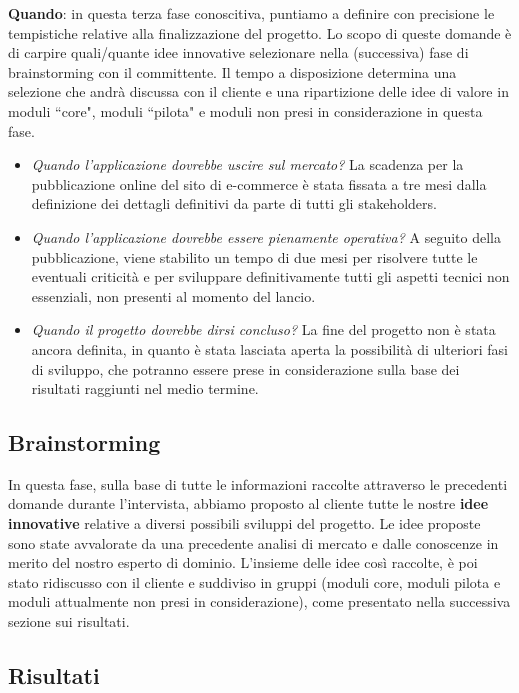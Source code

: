 \documentclass[12pt]{article}
\begin{document}
\textbf{Quando}: in questa terza fase conoscitiva, puntiamo a definire con precisione le tempistiche relative alla finalizzazione del progetto. Lo scopo di queste domande è di carpire quali/quante idee innovative selezionare nella (successiva) fase di brainstorming con il committente. Il tempo a disposizione determina una selezione che andrà discussa con il cliente e una ripartizione delle idee di valore in moduli ``core", moduli ``pilota" e moduli non presi in considerazione in questa fase.
\begin{itemize}
    \item {\em Quando l'applicazione dovrebbe uscire sul mercato?}
    La scadenza per la pubblicazione online del sito di e-commerce è stata fissata a tre mesi dalla definizione dei dettagli definitivi da parte di tutti gli stakeholders. 
    \item {\em Quando l'applicazione dovrebbe essere pienamente operativa?}
    A seguito della pubblicazione, viene stabilito un tempo di due mesi per risolvere tutte le eventuali criticità e per sviluppare definitivamente tutti gli aspetti tecnici non essenziali, non presenti al momento del lancio.
    \item {\em Quando il progetto dovrebbe dirsi concluso?}
    La fine del progetto non è stata ancora definita, in quanto è stata lasciata aperta la possibilità di ulteriori fasi di sviluppo, che potranno essere prese in considerazione sulla base dei risultati raggiunti nel medio termine.    
\end{itemize}


\subsection{Brainstorming}

In questa fase, sulla base di tutte le informazioni raccolte attraverso le precedenti domande durante l'intervista, abbiamo proposto al cliente tutte le nostre \textbf{idee innovative} relative a diversi possibili sviluppi del progetto. Le idee proposte sono state avvalorate da una precedente analisi di mercato e dalle conoscenze in merito del nostro esperto di dominio. L'insieme delle idee così raccolte, è poi stato ridiscusso con il cliente e suddiviso in gruppi (moduli core, moduli pilota e moduli attualmente non presi in considerazione), come presentato nella successiva sezione sui risultati.


\subsection{Risultati}
\end{document}
